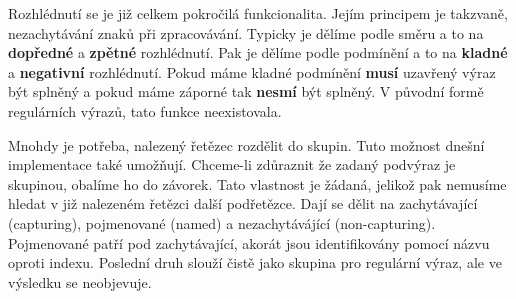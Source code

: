 Rozhlédnutí se je již celkem pokročilá funkcionalita. 
Jejím principem je takzvaně, nezachytávání znaků při zpracovávání.
Typicky je dělíme podle směru a to na \textbf{dopředné} a \textbf{zpětné} rozhlédnutí.
Pak je dělíme podle podmínění a to na \textbf{kladné} a \textbf{negativní} rozhlédnutí.
Pokud máme kladné podmínění \textbf{musí} uzavřený výraz být splněný a pokud máme záporné tak \textbf{nesmí} být splněný.
V původní formě regulárních výrazů, tato funkce neexistovala.

Mnohdy je potřeba, nalezený řetězec rozdělit do skupin. 
Tuto možnost dnešní implementace také umožňují.
Chceme-li zdůraznit že zadaný podvýraz je skupinou, obalíme ho do závorek.
Tato vlastnost je žádaná, jelikož pak nemusíme hledat v již nalezeném řetězci další podřetězce.
Dají se dělit na zachytávající (capturing), pojmenované (named) a nezachytávájící (non-capturing).
Pojmenované patří pod zachytávající, akorát jsou identifikovány pomocí názvu oproti indexu.
Poslední druh slouží čistě jako skupina pro regulární výraz, ale ve výsledku se neobjevuje.

\endinput